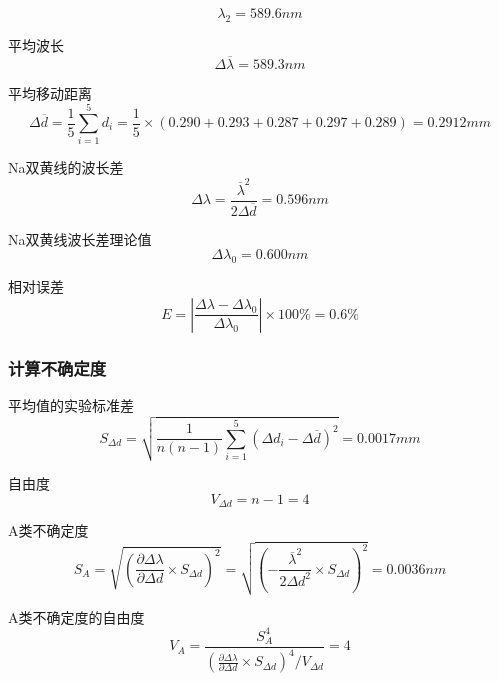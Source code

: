 \documentclass[12pt,a4paper,UTF8]{ctexart}
\begin{document}
\begin{equation*}
	\lambda_2=589.6nm
\end{equation*}

平均波长
\begin{equation*}
	\varDelta \overline{\lambda} =589.3nm
\end{equation*}

平均移动距离
\begin{equation*}
	\varDelta \overline{d}= \frac{1}{5}\sum_{i = 1}^{5}  d_i=\frac{1}{5} \times (0.290+0.293+0.287+0.297+0.289)=0.2912mm
\end{equation*} 

Na双黄线的波长差
\begin{equation*}
	\varDelta \lambda=\frac{\overline{\lambda}^{2}}{2\varDelta \overline{d}}=0.596nm
\end{equation*}

Na双黄线波长差理论值
\begin{equation*}
	\varDelta \lambda_0=0.600nm
\end{equation*}

相对误差 
\begin{equation*}
	E=\left\lvert \frac{\varDelta \lambda-\varDelta \lambda_0}{\varDelta \lambda_0}\right\rvert \times 100\%=0.6\%
\end{equation*}

\subsubsection*{计算不确定度}
平均值的实验标准差
\begin{equation*}
	S_{\varDelta d}=\sqrt{\frac{1}{n(n-1)}\sum_{i = 1}^{5}(\varDelta d_i-\varDelta \overline{d})^{2}} =0.0017mm
\end{equation*}

自由度
\begin{equation*}
	V_{\varDelta d}=n-1=4
\end{equation*}

A类不确定度
\begin{equation*}
	S_A=\sqrt{{\left( \frac{\partial \varDelta \lambda}{\partial \varDelta d}\times S_{\varDelta d}\right) }^2}=
	\sqrt{{\left( -\frac{\overline{\lambda}^2}{2 \varDelta d^2}\times S_{\varDelta d}\right) }^2}=0.0036nm
\end{equation*}

A类不确定度的自由度
\begin{equation*}
	V_A=\frac{S_A^4}{\left( \frac{\partial \varDelta \lambda}{\partial \varDelta d}\times S_{\varDelta d}\right) ^4 / V_{\varDelta d}}=4
\end{equation*}
\end{document}
